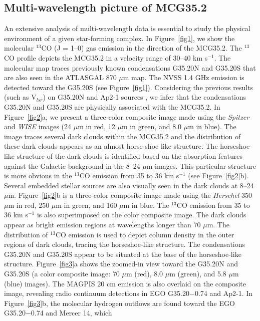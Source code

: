 \documentclass[iop]{emulateapj}
\begin{document}
\subsection{Multi-wavelength picture of MCG35.2}
\label{sec:hh}
%
An extensive analysis of multi-wavelength data is essential to study the physical environment of a given star-forming complex.
In Figure~\ref{fig1}, we show the molecular $^{13}$CO (J = 1--0) gas emission in the direction 
of the MCG35.2. The $^{13}$CO profile depicts the MCG35.2 in a velocity range of 30--40 km s$^{-1}$. 
The molecular map traces previously known condensations G35.20N and G35.20S that are also seen in the ATLASGAL 870 $\mu$m map.
The NVSS 1.4 GHz emission is detected toward the G35.20S (see Figure~\ref{fig1}). 
Considering the previous results (such as V$_{lsr}$) on G35.20N and Ap2-1 sources \citep{sanchez14,paron10}, we infer that the condensations 
G35.20N and G35.20S are physically associated with the MCG35.2. In Figure~\ref{fig2}a, we present a three-color composite 
image made using the {\it Spitzer} and {\it WISE} images (24 $\mu$m in red, 12 $\mu$m in green, and 8.0 $\mu$m in blue). 
The image traces several dark clouds within the MCG35.2 and the distribution of these dark clouds appears as an almost horse-shoe like structure.
The horseshoe-like structure of the dark clouds is identified based on the absorption 
features against the Galactic background in the 8--24 $\mu$m images. 
This particular structure is more obvious in the $^{13}$CO emission from 35 to 36 km s$^{-1}$ (see Figure~\ref{fig2}b). 
Several embedded stellar sources are also visually seen 
in the dark clouds at 8--24 $\mu$m. Figure~\ref{fig2}b is a three-color composite image made using the 
{\it Herschel} 350 $\mu$m in red, 250 $\mu$m in green, and 160 $\mu$m in blue. 
The $^{13}$CO emission from 35 to 36 km s$^{-1}$ is also superimposed on the color composite image. 
The dark clouds appear as bright emission regions at wavelengths longer than 70 $\mu$m. 
The distribution of $^{13}$CO emission is used to depict column density in the outer regions of dark clouds, tracing the horseshoe-like structure. 
The condensations G35.20N and G35.20S appear to be situated 
at the base of the horseshoe-like structure. Figure~\ref{fig3}a shows the zoomed-in view toward the G35.20N and G35.20S 
(a color composite image: 70 $\mu$m (red), 8.0 $\mu$m (green), and 5.8 $\mu$m (blue) images). 
The MAGPIS 20 cm emission is also overlaid on the composite image, revealing radio continuum 
detections in EGO G35.20$-$0.74 and Ap2-1. 
In Figure~\ref{fig3}b, the molecular hydrogen outflows are found toward the EGO G35.20$-$0.74 and Mercer 14, which 
\end{document}
